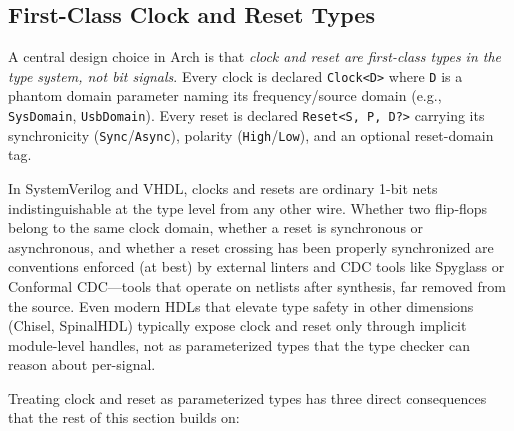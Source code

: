 \documentclass[11pt,twocolumn]{article}
\begin{document}
\subsection{First-Class Clock and Reset Types}
\label{sec:clockreset}

A central design choice in Arch is that \emph{clock and reset are first-class types in the type system, not bit signals}. Every clock is declared \texttt{Clock<D>} where \texttt{D} is a phantom domain parameter naming its frequency/source domain (e.g., \texttt{SysDomain}, \texttt{UsbDomain}). Every reset is declared \texttt{Reset<S, P, D?>} carrying its synchronicity (\texttt{Sync}/\texttt{Async}), polarity (\texttt{High}/\texttt{Low}), and an optional reset-domain tag.

In SystemVerilog and VHDL, clocks and resets are ordinary 1-bit nets indistinguishable at the type level from any other wire. Whether two flip-flops belong to the same clock domain, whether a reset is synchronous or asynchronous, and whether a reset crossing has been properly synchronized are conventions enforced (at best) by external linters and CDC tools like Spyglass or Conformal CDC---tools that operate on netlists after synthesis, far removed from the source. Even modern HDLs that elevate type safety in other dimensions (Chisel, SpinalHDL) typically expose clock and reset only through implicit module-level handles, not as parameterized types that the type checker can reason about per-signal.

Treating clock and reset as parameterized types has three direct consequences that the rest of this section builds on:
\end{document}
